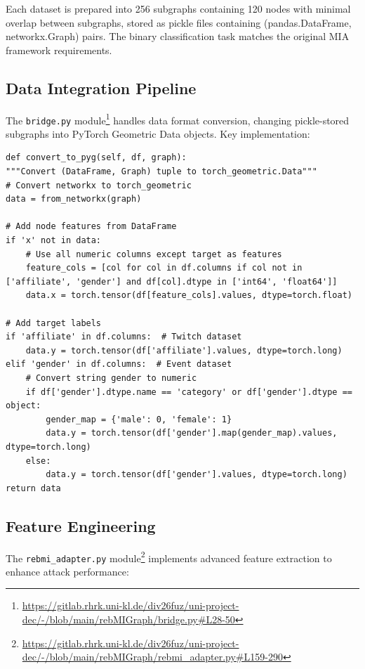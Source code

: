 \documentclass{article}
\begin{document}
Each dataset is prepared into 256 subgraphs containing 120 nodes with minimal overlap between subgraphs, stored as pickle files containing (pandas.DataFrame, networkx.Graph) pairs. The binary classification task matches the original MIA framework requirements.

\subsection{Data Integration Pipeline}
The \texttt{bridge.py} module\footnote{\url{https://gitlab.rhrk.uni-kl.de/div26fuz/uni-project-dec/-/blob/main/rebMIGraph/bridge.py\#L28-50}} handles data format conversion, changing pickle-stored subgraphs into PyTorch Geometric Data objects. Key implementation:
\begin{verbatim}
def convert_to_pyg(self, df, graph):
"""Convert (DataFrame, Graph) tuple to torch_geometric.Data"""
# Convert networkx to torch_geometric
data = from_networkx(graph)

# Add node features from DataFrame
if 'x' not in data:
    # Use all numeric columns except target as features
    feature_cols = [col for col in df.columns if col not in ['affiliate', 'gender'] and df[col].dtype in ['int64', 'float64']]
    data.x = torch.tensor(df[feature_cols].values, dtype=torch.float)

# Add target labels
if 'affiliate' in df.columns:  # Twitch dataset
    data.y = torch.tensor(df['affiliate'].values, dtype=torch.long)
elif 'gender' in df.columns:  # Event dataset
    # Convert string gender to numeric
    if df['gender'].dtype.name == 'category' or df['gender'].dtype == object:
        gender_map = {'male': 0, 'female': 1}
        data.y = torch.tensor(df['gender'].map(gender_map).values, dtype=torch.long)
    else:
        data.y = torch.tensor(df['gender'].values, dtype=torch.long)
return data
\end{verbatim}

\subsection{Feature Engineering}
The \texttt{rebmi\_adapter.py} module\footnote{\url{https://gitlab.rhrk.uni-kl.de/div26fuz/uni-project-dec/-/blob/main/rebMIGraph/rebmi_adapter.py\#L159-290}} implements advanced feature extraction to enhance attack performance:
\end{document}
